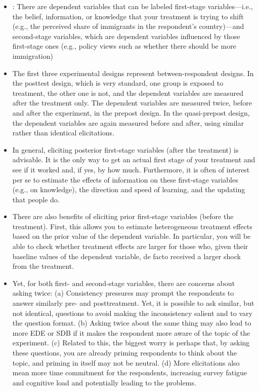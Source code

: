 \documentclass[a4paper, 12pt]{article}
\begin{document}
\begin{itemize}
\begin{itemize}
        \item : There are dependent variables that can be labeled first-stage variables—i.e., the belief, information, or knowledge that your treatment is trying to shift (e.g., the perceived share of immigrants in the respondent’s country)—and second-stage variables, which are dependent variables influenced by those first-stage ones (e.g., policy views such as whether there should be more immigration)
        \item The first three experimental designs represent between-respondent designs. In the posttest design, which is very standard, one group is exposed to treatment, the other one is not, and the dependent variables are measured after the treatment only. The dependent variables are measured twice, before and after the experiment, in the prepost design. In the quasi-prepost design, the dependent variables are again measured before and after, using similar rather than identical elicitations.
        \item In general, eliciting posterior first-stage variables (after the treatment) is advisable. It is the only way to get an actual first stage of your treatment and see if it worked and, if yes, by how much. Furthermore, it is often of interest per se to estimate the effects of information on these first-stage variables (e.g., on knowledge), the direction and speed of learning, and the updating that people do.
        \item There are also benefits of eliciting prior first-stage variables (before the treatment). First, this allows you to estimate heterogeneous treatment effects based on the prior value of the dependent variable. In particular, you will be able to check whether treatment effects are larger for those who, given their baseline values of the dependent variable, de facto received a larger shock from the treatment.
        \item Yet, for both first- and second-stage variables, there are concerns about asking twice: (a) Consistency pressures may prompt the respondents to answer similarly pre- and posttreatment. Yet, it is possible to ask similar, but not identical, questions to avoid making the inconsistency salient and to vary the question format. (b) Asking twice about the same thing may also lead to more EDE or SDB if it makes the respondent more aware of the topic of the experiment. (c) Related to this, the biggest worry is perhaps that, by asking these questions, you are already priming respondents to think about the topic, and priming in itself may not be neutral. (d) More elicitations also mean more time commitment for the respondents, increasing survey fatigue and cognitive load and potentially leading to the problems.

\end{itemize}
\end{itemize}
\end{document}
